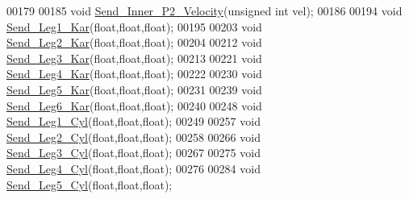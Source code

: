 \begin{DoxyCode}
00179 
00185 \textcolor{keywordtype}{void} \hyperlink{servo___u_a_r_t_8h_a9cb7e763d9a3501fc345a424d67975a7}{Send\_Inner\_P2\_Velocity}(\textcolor{keywordtype}{unsigned} \textcolor{keywordtype}{int} vel); 
00186 
00194 \textcolor{keywordtype}{void} \hyperlink{servo___u_a_r_t_8h_adde8722cd4b494d02bce7a39b14aed52}{Send\_Leg1\_Kar}(\textcolor{keywordtype}{float},\textcolor{keywordtype}{float},\textcolor{keywordtype}{float});
00195 
00203 \textcolor{keywordtype}{void} \hyperlink{servo___u_a_r_t_8h_a85bfa5d3057fbf4096d5fc8665d717b8}{Send\_Leg2\_Kar}(\textcolor{keywordtype}{float},\textcolor{keywordtype}{float},\textcolor{keywordtype}{float});
00204 
00212 \textcolor{keywordtype}{void} \hyperlink{servo___u_a_r_t_8h_a855b410dfcceb0e5f25d57ee17f86932}{Send\_Leg3\_Kar}(\textcolor{keywordtype}{float},\textcolor{keywordtype}{float},\textcolor{keywordtype}{float});
00213 
00221 \textcolor{keywordtype}{void} \hyperlink{servo___u_a_r_t_8h_adc36f085a0d265c937fae59651a06703}{Send\_Leg4\_Kar}(\textcolor{keywordtype}{float},\textcolor{keywordtype}{float},\textcolor{keywordtype}{float});
00222 
00230 \textcolor{keywordtype}{void} \hyperlink{servo___u_a_r_t_8h_a0945e0fa1be61238d314e7334bdc9990}{Send\_Leg5\_Kar}(\textcolor{keywordtype}{float},\textcolor{keywordtype}{float},\textcolor{keywordtype}{float});
00231 
00239 \textcolor{keywordtype}{void} \hyperlink{servo___u_a_r_t_8h_a2178defeed6cf9781991514439dd799b}{Send\_Leg6\_Kar}(\textcolor{keywordtype}{float},\textcolor{keywordtype}{float},\textcolor{keywordtype}{float});
00240 
00248 \textcolor{keywordtype}{void} \hyperlink{servo___u_a_r_t_8h_af1a73e7eb43491c163ad5031a2506a00}{Send\_Leg1\_Cyl}(\textcolor{keywordtype}{float},\textcolor{keywordtype}{float},\textcolor{keywordtype}{float});
00249 
00257 \textcolor{keywordtype}{void} \hyperlink{servo___u_a_r_t_8h_a5bf2231681a97180dd8f31da17814b9e}{Send\_Leg2\_Cyl}(\textcolor{keywordtype}{float},\textcolor{keywordtype}{float},\textcolor{keywordtype}{float});
00258 
00266 \textcolor{keywordtype}{void} \hyperlink{servo___u_a_r_t_8h_ae482cf70fc4b70fe8f4201eeffc54f51}{Send\_Leg3\_Cyl}(\textcolor{keywordtype}{float},\textcolor{keywordtype}{float},\textcolor{keywordtype}{float});
00267 
00275 \textcolor{keywordtype}{void} \hyperlink{servo___u_a_r_t_8h_ab2b44997220df53e3737bfc35bc8b0aa}{Send\_Leg4\_Cyl}(\textcolor{keywordtype}{float},\textcolor{keywordtype}{float},\textcolor{keywordtype}{float});
00276 
00284 \textcolor{keywordtype}{void} \hyperlink{servo___u_a_r_t_8h_a520acee2912480717b1bbcbb904e23c4}{Send\_Leg5\_Cyl}(\textcolor{keywordtype}{float},\textcolor{keywordtype}{float},\textcolor{keywordtype}{float});

\end{DoxyCode}
